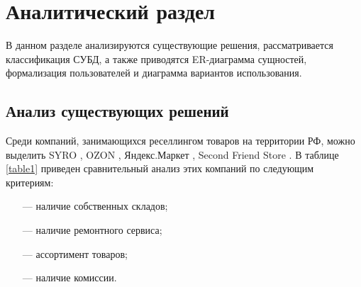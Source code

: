 \chapter{Аналитический раздел}

В данном разделе анализируются существующие решения, рассматривается классификация СУБД, а также приводятся ER-диаграмма сущностей, формализация пользователей и диаграмма вариантов использования.

\section{Анализ существующих решений}
Среди компаний, занимающихся реселлингом товаров на территории РФ, можно выделить SYRO \cite{src_site1}, OZON \cite{src_site2}, Яндекс.Маркет \cite{src_site3}, Second Friend Store \cite{src_site4}.
В таблице \ref{table1} приведен сравнительный анализ этих компаний по следующим критериям:
\begin{itemize}
	\item[---] наличие собственных складов;
	\item[---] наличие ремонтного сервиса;
	\item[---] ассортимент товаров;
	\item[---] наличие комиссии.
\end{itemize}

